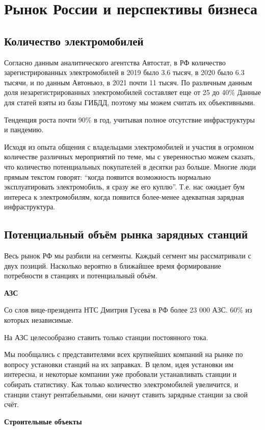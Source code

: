 \documentclass[a4paper,12pt]{report}
\begin{document}
\chapter{Рынок России и перспективы бизнеса}
\section{Количество электромобилей}
Согласно данным аналитического агентства Автостат, в РФ количество зарегистрированных электромобилей в 2019 было 3.6 тысяч, в 2020 было 6.3 тысячи, и по данным Автоньюз, в 2021 почти 11 тысяч. По различным данным доля незарегистрированных электромобилей составляет еще от 25 до 40\% Данные для статей взяты из базы ГИБДД, поэтому мы можем считать их объективными. 

Тенденция роста почти 90\% в год, учитывая полное отсутствие инфраструктуры и пандемию.

Исходя из опыта общения с владельцами электромобилей и участия в огромном количестве различных мероприятий по теме, мы с уверенностью можем сказать, что количество потенциальных покупателей в десятки раз больше. Многие люди прямым текстом говорят: “когда появится возможность нормально эксплуатировать электромобиль, я сразу же его куплю”. Т.е. нас ожидает бум интереса к электромобилям, когда появится более-менее адекватная зарядная инфраструктура. 

\section{Потенциальный объём рынка зарядных станций}
Весь рынок РФ мы разбили на сегменты. Каждый сегмент мы рассматривали с двух позиций. Насколько вероятно в ближайшее время формирование потребности в станциях и потенциальный объём. 

\textbf{АЗС}

Со слов вице-президента НТС Дмитрия Гусева в РФ более 23 000 АЗС. 60\% из которых независимые. 

На АЗС целесообразно ставить только станции постоянного тока.

Мы пообщались с представителями всех крупнейших компаний на рынке по вопросу установки станций на их заправках. В целом, идея установки им интересна, и некоторые компании уже пробовали устанавливать станции и собирать статистику. Как только количество электромобилей увеличится, и станции станут рентабельными, они начнут ставить зарядные станции за свой счёт.


\textbf{Строительные объекты}
\end{document}
